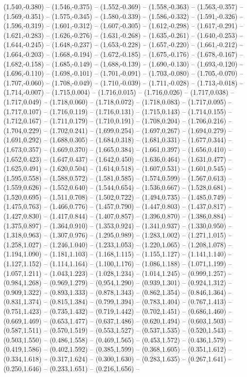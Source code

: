 (1.540,-0.380) -- (1.546,-0.375) -- (1.552,-0.369) -- (1.558,-0.363) -- (1.563,-0.357) -- (1.569,-0.351) -- (1.575,-0.345) -- (1.580,-0.339) -- (1.586,-0.332) -- (1.591,-0.326) -- (1.596,-0.319) -- (1.601,-0.312) -- (1.607,-0.305) -- (1.612,-0.298) -- (1.617,-0.291) -- (1.621,-0.283) -- (1.626,-0.276) -- (1.631,-0.268) -- (1.635,-0.261) -- (1.640,-0.253) -- (1.644,-0.245) -- (1.648,-0.237) -- (1.653,-0.228) -- (1.657,-0.220) -- (1.661,-0.212) -- (1.664,-0.203) -- (1.668,-0.194) -- (1.672,-0.185) -- (1.675,-0.176) -- (1.678,-0.167) -- (1.682,-0.158) -- (1.685,-0.149) -- (1.688,-0.139) -- (1.690,-0.130) -- (1.693,-0.120) -- (1.696,-0.110) -- (1.698,-0.101) -- (1.701,-0.091) -- (1.703,-0.080) -- (1.705,-0.070) -- (1.707,-0.060) -- (1.708,-0.049) -- (1.710,-0.039) -- (1.711,-0.028) -- (1.713,-0.018) -- (1.714,-0.007) -- (1.715,0.004) -- (1.716,0.015) -- (1.716,0.026) -- (1.717,0.038) -- (1.717,0.049) -- (1.718,0.060) -- (1.718,0.072) -- (1.718,0.083) -- (1.717,0.095) -- (1.717,0.107) -- (1.716,0.119) -- (1.716,0.131) -- (1.715,0.143) -- (1.714,0.155) -- (1.712,0.167) -- (1.711,0.179) -- (1.710,0.191) -- (1.708,0.204) -- (1.706,0.216) -- (1.704,0.229) -- (1.702,0.241) -- (1.699,0.254) -- (1.697,0.267) -- (1.694,0.279) -- (1.691,0.292) -- (1.688,0.305) -- (1.684,0.318) -- (1.681,0.331) -- (1.677,0.344) -- (1.673,0.357) -- (1.669,0.370) -- (1.665,0.384) -- (1.661,0.397) -- (1.656,0.410) -- (1.652,0.423) -- (1.647,0.437) -- (1.642,0.450) -- (1.636,0.464) -- (1.631,0.477) -- (1.625,0.491) -- (1.620,0.504) -- (1.614,0.518) -- (1.607,0.531) -- (1.601,0.545) -- (1.595,0.558) -- (1.588,0.572) -- (1.581,0.585) -- (1.574,0.599) -- (1.567,0.613) -- (1.559,0.626) -- (1.552,0.640) -- (1.544,0.654) -- (1.536,0.667) -- (1.528,0.681) -- (1.520,0.695) -- (1.511,0.708) -- (1.502,0.722) -- (1.494,0.735) -- (1.485,0.749) -- (1.475,0.763) -- (1.466,0.776) -- (1.457,0.790) -- (1.447,0.803) -- (1.437,0.817) -- (1.427,0.830) -- (1.417,0.844) -- (1.407,0.857) -- (1.396,0.870) -- (1.386,0.884) -- (1.375,0.897) -- (1.364,0.910) -- (1.353,0.924) -- (1.341,0.937) -- (1.330,0.950) -- (1.318,0.963) -- (1.307,0.976) -- (1.295,0.989) -- (1.283,1.002) -- (1.271,1.015) -- (1.258,1.027) -- (1.246,1.040) -- (1.233,1.053) -- (1.220,1.065) -- (1.208,1.078) -- (1.194,1.090) -- (1.181,1.103) -- (1.168,1.115) -- (1.155,1.127) -- (1.141,1.140) -- (1.127,1.152) -- (1.114,1.164) -- (1.100,1.176) -- (1.086,1.188) -- (1.071,1.199) -- (1.057,1.211) -- (1.043,1.223) -- (1.028,1.234) -- (1.014,1.245) -- (0.999,1.257) -- (0.984,1.268) -- (0.969,1.279) -- (0.954,1.290) -- (0.939,1.301) -- (0.924,1.312) -- (0.909,1.322) -- (0.893,1.333) -- (0.878,1.343) -- (0.862,1.354) -- (0.846,1.364) -- (0.831,1.374) -- (0.815,1.384) -- (0.799,1.394) -- (0.783,1.404) -- (0.767,1.413) -- (0.751,1.423) -- (0.735,1.432) -- (0.719,1.442) -- (0.702,1.451) -- (0.686,1.460) -- (0.669,1.469) -- (0.653,1.477) -- (0.637,1.486) -- (0.620,1.494) -- (0.603,1.503) -- (0.587,1.511) -- (0.570,1.519) -- (0.553,1.527) -- (0.537,1.535) -- (0.520,1.543) -- (0.503,1.550) -- (0.486,1.558) -- (0.469,1.565) -- (0.453,1.572) -- (0.436,1.579) -- (0.419,1.586) -- (0.402,1.592) -- (0.385,1.599) -- (0.368,1.605) -- (0.351,1.612) -- (0.334,1.618) -- (0.317,1.624) -- (0.300,1.630) -- (0.283,1.635) -- (0.267,1.641) -- (0.250,1.646) -- (0.233,1.651) -- (0.216,1.656) -- 